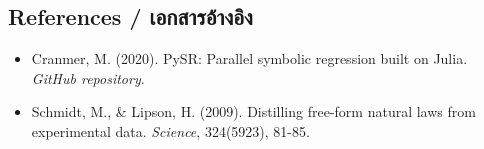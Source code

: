 \subsection{References \quad / \quad \textthai{เอกสารอ้างอิง}}
\begin{itemize}
    \item Cranmer, M. (2020). PySR: Parallel symbolic regression built on Julia. \textit{GitHub repository}.
    \item Schmidt, M., \& Lipson, H. (2009). Distilling free-form natural laws from experimental data. \textit{Science}, 324(5923), 81-85.
\end{itemize}
